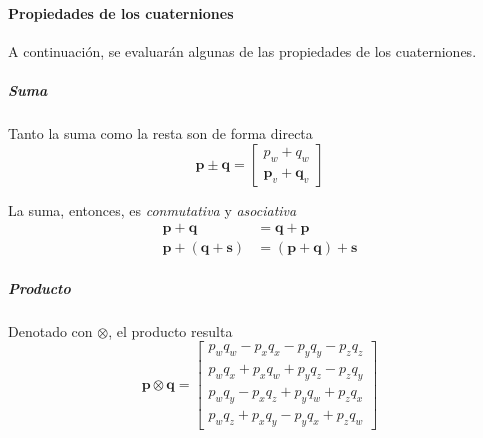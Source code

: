 \paragraph{Propiedades de los cuaterniones}
A continuación, se evaluarán algunas de las propiedades de los cuaterniones.
\subparagraph{Suma}
Tanto la suma como la resta son de forma directa
\begin{equation}
    \bm{p} \pm \bm{q} =
    \begin{bmatrix}
        p_w + q_w \\
        \bm{p}_v + \bm{q}_v
    \end{bmatrix}
\end{equation}

La suma, entonces, es \textit{conmutativa} y \textit{asociativa}
\begin{align}
    \bm{p} + \bm{q} &= \bm{q} + \bm{p} \\
    \bm{p} + (\bm{q} + \bm{s}) &= (\bm{p} + \bm{q}) + \bm{s}
\end{align}

\subparagraph{Producto}
Denotado con $\otimes$, el producto resulta
\begin{equation}
    \bm{p}\otimes\bm{q} = 
    \begin{bmatrix}
        p_wq_w - p_xq_x - p_yq_y - p_zq_z \\
        p_wq_x + p_xq_w + p_yq_z - p_zq_y \\
        p_wq_y - p_xq_z + p_yq_w + p_zq_x \\
        p_wq_z + p_xq_y - p_yq_x + p_zq_w
    \end{bmatrix}
\end{equation}

